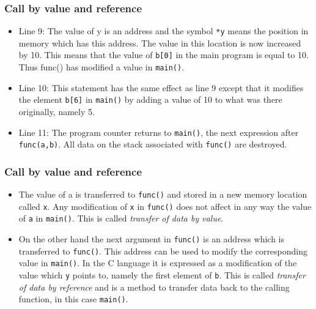 \documentclass[handout]{beamer}
\begin{document}
\begin{frame}
\frametitle{Call by value and reference}

\begin{itemize}
  \item Line 9: The value of y is an address and the symbol \Verb!*y! means the position in memory which has this address. The value in this location is now increased by 10. This means that the value of \Verb!b[0]! in the main program is equal to 10. Thus func() has modified a value in \Verb!main()!.

  \item Line 10: This statement has the same effect as line 9 except that it modifies the element \Verb!b[6]! in \Verb!main()! by adding a value of 10 to what was there originally, namely 5.

  \item Line 11: The program counter returns to \Verb!main()!, the next expression after \Verb!func(a,b)!. All data on the stack associated with \Verb!func()! are destroyed.
\end{itemize}

\noindent
\end{frame}

\begin{frame}
\frametitle{Call by value and reference}

\begin{itemize}
  \item The value of a is transferred to \Verb!func()! and stored in a new memory location called \Verb!x!. Any modification of \Verb!x! in \Verb!func()! does not affect in any way the value of \Verb!a! in \Verb!main()!. This is called \emph{transfer of data by value}.

  \item On the other hand the next argument in \Verb!func()! is an address which is transferred to \Verb!func()!. This address can be used to modify the corresponding value in \Verb!main()!. In the C language it is expressed as a modification of the value which \Verb!y! points to, namely the first element of \Verb!b!. This is called \emph{transfer of data by reference} and is a method to transfer data back to the calling function, in this case \Verb!main()!.
\end{itemize}

\noindent
\end{frame}
\end{document}
